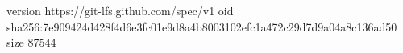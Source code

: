 version https://git-lfs.github.com/spec/v1
oid sha256:7e909424d428f4d6e3fc01e9d8a4b8003102efc1a472c29d7d9a04a8c136ad50
size 87544
